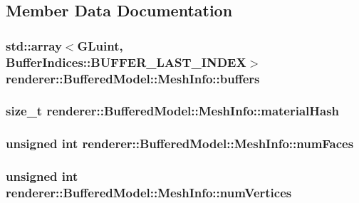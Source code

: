 \subsection{Member Data Documentation}
\hypertarget{structrenderer_1_1BufferedModel_1_1MeshInfo_a9b601e962fe9f0cb4b57517fb7a468ae}{
\subsubsection[{buffers}]{\setlength{\rightskip}{0pt plus 5cm}std\-::array$<${\bf G\-Luint}, Buffer\-Indices\-::\-B\-U\-F\-F\-E\-R\-\_\-\-L\-A\-S\-T\-\_\-\-I\-N\-D\-E\-X$>$ renderer\-::\-Buffered\-Model\-::\-Mesh\-Info\-::buffers}}\label{structrenderer_1_1BufferedModel_1_1MeshInfo_a9b601e962fe9f0cb4b57517fb7a468ae}
\hypertarget{structrenderer_1_1BufferedModel_1_1MeshInfo_a063d231567cb1d5e5f2960f538a0eabb}{
\subsubsection[{material\-Hash}]{\setlength{\rightskip}{0pt plus 5cm}size\-\_\-t renderer\-::\-Buffered\-Model\-::\-Mesh\-Info\-::material\-Hash}}\label{structrenderer_1_1BufferedModel_1_1MeshInfo_a063d231567cb1d5e5f2960f538a0eabb}
\hypertarget{structrenderer_1_1BufferedModel_1_1MeshInfo_afbb21a00c2a1d49f15fcd5bc42f81bab}{
\subsubsection[{num\-Faces}]{\setlength{\rightskip}{0pt plus 5cm}unsigned int renderer\-::\-Buffered\-Model\-::\-Mesh\-Info\-::num\-Faces}}\label{structrenderer_1_1BufferedModel_1_1MeshInfo_afbb21a00c2a1d49f15fcd5bc42f81bab}
\hypertarget{structrenderer_1_1BufferedModel_1_1MeshInfo_ac6add8731c532c5ac5c1b26fc16130c5}{
\subsubsection[{num\-Vertices}]{\setlength{\rightskip}{0pt plus 5cm}unsigned int renderer\-::\-Buffered\-Model\-::\-Mesh\-Info\-::num\-Vertices}}\label{structrenderer_1_1BufferedModel_1_1MeshInfo_ac6add8731c532c5ac5c1b26fc16130c5}
